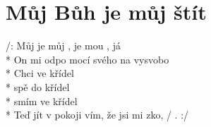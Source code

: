 \section{Můj Bůh je můj štít}
/: Můj   je můj  , je mou  , já   \\*
On mi odpo mocí svého  na vysvobo\\*
Chci   ve   křídel   \\* 
spě do   křídel  \\*
smím   ve   křídel  \\*
Teď   jít v pokoji   vím, že jsi mi  zko,  / . :/

